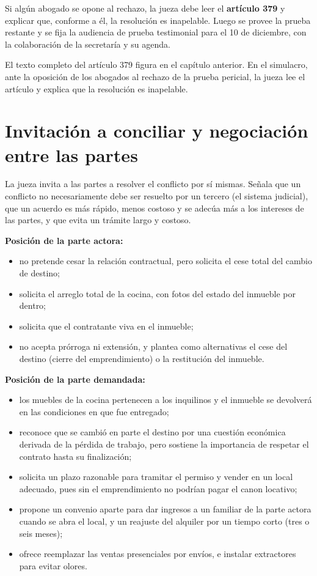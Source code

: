 \documentclass[12pt,oneside]{book}
\begin{document}
Si algún abogado se opone al rechazo, la jueza debe leer el \textbf{artículo 379} y explicar que, conforme a él, la resolución es inapelable. Luego se provee la prueba restante y se fija la audiencia de prueba testimonial para el 10 de diciembre, con la colaboración de la secretaría y su agenda.

\begin{note}
El texto completo del artículo 379 figura en el capítulo anterior. En el simulacro, ante la oposición de los abogados al rechazo de la prueba pericial, la jueza lee el artículo y explica que la resolución es inapelable.
\end{note}

\section{Invitación a conciliar y negociación entre las partes}

La jueza invita a las partes a resolver el conflicto por sí mismas. Señala que un conflicto no necesariamente debe ser resuelto por un tercero (el sistema judicial), que un acuerdo es más rápido, menos costoso y se adecúa más a los intereses de las partes, y que evita un trámite largo y costoso.

\textbf{Posición de la parte actora:}

\begin{itemize}
    \item no pretende cesar la relación contractual, pero solicita el cese total del cambio de destino;
    \item solicita el arreglo total de la cocina, con fotos del estado del inmueble por dentro;
    \item solicita que el contratante viva en el inmueble;
    \item no acepta prórroga ni extensión, y plantea como alternativas el cese del destino (cierre del emprendimiento) o la restitución del inmueble.
\end{itemize}

\textbf{Posición de la parte demandada:}

\begin{itemize}
    \item los muebles de la cocina pertenecen a los inquilinos y el inmueble se devolverá en las condiciones en que fue entregado;
    \item reconoce que se cambió en parte el destino por una cuestión económica derivada de la pérdida de trabajo, pero sostiene la importancia de respetar el contrato hasta su finalización;
    \item solicita un plazo razonable para tramitar el permiso y vender en un local adecuado, pues sin el emprendimiento no podrían pagar el canon locativo;
    \item propone un convenio aparte para dar ingresos a un familiar de la parte actora cuando se abra el local, y un reajuste del alquiler por un tiempo corto (tres o seis meses);
    \item ofrece reemplazar las ventas presenciales por envíos, e instalar extractores para evitar olores.
\end{itemize}
\end{document}
